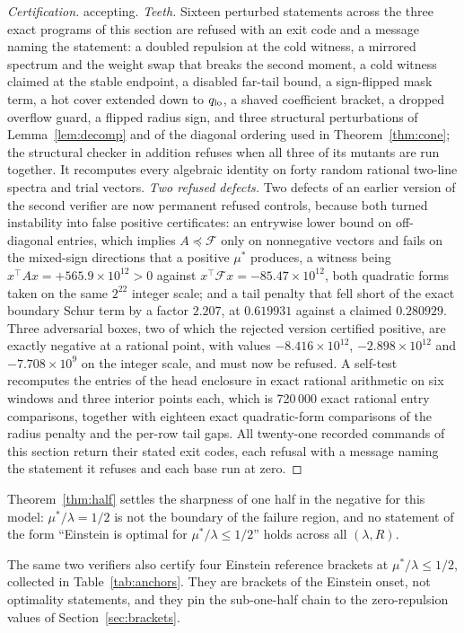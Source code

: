 \documentclass[11pt]{article}
\newcommand{\Fcal}{\mathcal F}
\newcommand{\muS}{\mu^{*}}
\theoremstyle{definition}
\theoremstyle{remark}
\begin{document}
\begin{proof}[Certification]
accepting.
\emph{Teeth.} Sixteen perturbed statements across the three exact programs of this
section are refused with an exit code and a message naming the statement: a doubled
repulsion at the cold witness, a mirrored spectrum and the weight swap that breaks the
second moment, a cold witness claimed at the stable endpoint, a disabled far-tail bound, a
sign-flipped mask term, a hot cover extended down to $q_{\rm lo}$, a shaved coefficient
bracket, a dropped overflow guard, a flipped radius sign, and three structural
perturbations of Lemma~\ref{lem:decomp} and of the diagonal ordering used in
Theorem~\ref{thm:cone}; the structural checker in addition refuses when all three of its
mutants are run together. It recomputes every algebraic identity on forty random rational
two-line spectra and trial vectors.
\emph{Two refused defects.} Two defects of an earlier version of the second verifier are
now permanent refused controls, because both turned instability into false positive
certificates: an entrywise lower bound on off-diagonal entries, which implies
$A\preceq\Fcal$ only on nonnegative vectors and fails on the mixed-sign directions that a
positive $\muS$ produces, a witness being $x^{\!\top}Ax=+565.9\times10^{12}>0$ against
$x^{\!\top}\Fcal x=-85.47\times10^{12}$, both quadratic forms taken on the same
$2^{22}$ integer scale; and a tail penalty that fell short of the exact
boundary Schur term by a factor $2.207$, at $0.619931$ against a claimed $0.280929$. Three
adversarial boxes, two of which the rejected version certified positive, are exactly
negative at a rational point, with values $-8.416\times10^{12}$, $-2.898\times10^{12}$ and
$-7.708\times10^{9}$ on the integer scale, and must now be refused. A self-test
recomputes the entries of the head enclosure in exact rational arithmetic on six windows
and three interior points each, which is 720\,000 exact rational entry comparisons,
together with eighteen exact quadratic-form comparisons of the radius penalty and the
per-row tail gaps. All twenty-one recorded commands of this section return their stated
exit codes, each refusal with a message naming the statement it refuses and each base run
at zero.
\end{proof}

Theorem~\ref{thm:half} settles the sharpness of one half in the negative for this model:
$\muS/\lambda=1/2$ is not the boundary of the failure region, and no statement of the form
``Einstein is optimal for $\muS/\lambda\le1/2$'' holds across all $(\lambda,R)$.

The same two verifiers also certify four Einstein reference brackets at
$\muS/\lambda\le1/2$, collected in Table~\ref{tab:anchors}. They are brackets of the
Einstein onset, not optimality statements, and they pin the sub-one-half chain to the
zero-repulsion values of Section~\ref{sec:brackets}.
\end{document}
